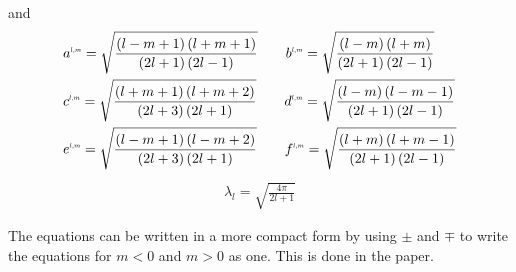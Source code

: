 and
\begin{align*}
&
a^{\scaleto{l,m}{4pt}}= \sqrt{\frac{\left(l-m+1\right)\left(l+m+1\right)}{\left(2l+1\right)\left(2l-1\right)}} \qquad
b^{\scaleto{l,m}{4pt}}= \sqrt{\frac{\left(l-m\right)\left(l+m\right)}{\left(2l+1\right)\left(2l-1\right)}}
\\&
c^{\scaleto{l,m}{4pt}}= \sqrt{\frac{\left(l+m+1\right)\left(l+m+2\right)}{\left(2l+3\right)\left(2l+1\right)}} \qquad
d^{\scaleto{l,m}{4pt}}= \sqrt{\frac{\left(l-m\right)\left(l-m-1\right)}{\left(2l+1\right)\left(2l-1\right)}}
\\&
e^{\scaleto{l,m}{4pt}}= \sqrt{\frac{\left(l-m+1\right)\left(l-m+2\right)}{\left(2l+3\right)\left(2l+1\right)}} \qquad
f^{\scaleto{l,m}{4pt}}= \sqrt{\frac{\left(l+m\right)\left(l+m-1\right)}{\left(2l+1\right)\left(2l-1\right)}}
\end{align*}
\begin{align*}
\lambda_l=\sqrt{\frac{4\pi}{2l+1}}
\end{align*}

The equations can be written in a more compact form by using $\pm$ and $\mp$ to write the equations for $m<0$ and $m>0$ as one. This is done in the paper.
